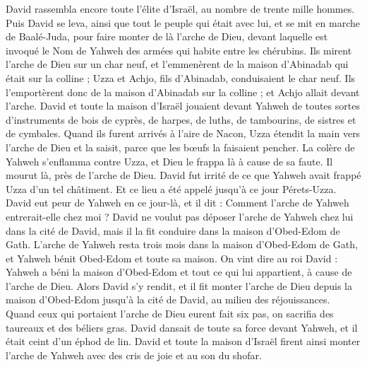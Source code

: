 \begin{multicols}{2}
\VerseOne{}David rassembla encore toute l'élite d'Israël, au nombre de trente mille hommes.
Puis David se leva, ainsi que tout le peuple qui était avec lui, et se mit en marche de Baalé-Juda, pour faire monter de là l'arche de Dieu, devant laquelle est invoqué le Nom de Yahweh des armées qui habite entre les chérubins.
Ils mirent l'arche de Dieu sur un char neuf, et l'emmenèrent de la maison d'Abinadab qui était sur la colline ; Uzza et Achjo, fils d'Abinadab, conduisaient le char neuf.
Ils l’emportèrent donc de la maison d'Abinadab sur la colline ; et Achjo allait devant l'arche.
David et toute la maison d'Israël jouaient devant Yahweh de toutes sortes d'instruments de bois de cyprès, de harpes, de luths, de tambourins, de sistres et de cymbales.
Quand ils furent arrivés à l'aire de Nacon, Uzza étendit la main vers l'arche de Dieu et la saisit, parce que les bœufs la faisaient pencher.
La colère de Yahweh s'enflamma contre Uzza, et Dieu le frappa là à cause de sa faute. Il mourut là, près de l'arche de Dieu.
David fut irrité de ce que Yahweh avait frappé Uzza d'un tel châtiment. Et ce lieu a été appelé jusqu'à ce jour Pérets-Uzza.
David eut peur de Yahweh en ce jour-là, et il dit : Comment l'arche de Yahweh entrerait-elle chez moi ?
David ne voulut pas déposer l'arche de Yahweh chez lui dans la cité de David, mais il la fit conduire dans la maison d'Obed-Edom de Gath.
L'arche de Yahweh resta trois mois dans la maison d'Obed-Edom de Gath, et Yahweh bénit Obed-Edom et toute sa maison.
On vint dire au roi David : Yahweh a béni la maison d'Obed-Edom et tout ce qui lui appartient, à cause de l'arche de Dieu. Alors David s'y rendit, et il fit monter l'arche de Dieu depuis la maison d'Obed-Edom jusqu’à la cité de David, au milieu des réjouissances.
Quand ceux qui portaient l'arche de Dieu eurent fait six pas, on sacrifia des taureaux et des béliers gras.
David dansait de toute sa force devant Yahweh, et il était ceint d'un éphod de lin.
David et toute la maison d'Israël firent ainsi monter l'arche de Yahweh avec des cris de joie et au son du shofar.

\end{multicols}
